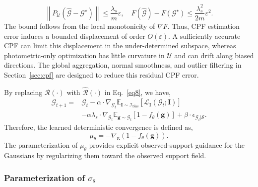 \documentclass[lettersize,journal]{IEEEtran}
\begin{document}
\begin{equation}
    \left\|P_{\mathcal{U}}(\widehat{\mathcal{G}}-\mathcal{G}^{\star})\right\|
    \le \frac{\lambda_s}{m}\varepsilon, \quad
    F(\widehat{\mathcal{G}})-F(\mathcal{G}^{\star})\le \frac{\lambda_s^2}{2m}\varepsilon^2 .
    \label{eq12_bound}
\end{equation}
The bound follows from the local monotonicity of $\nabla F$.
Thus, CPF estimation error induces a bounded displacement of order $O(\varepsilon)$. A sufficiently accurate CPF can limit this displacement in the under-determined subspace, whereas photometric-only optimization has little curvature in $\mathcal{U}$ and can drift along biased directions.
The global aggregation, normal smoothness, and outlier filtering in Section~\ref{sec:cpf} are designed to reduce this residual CPF error.

By replacing $\mathcal{R}(\cdot)$ with $\widehat{\mathcal{R}}(\cdot)$ in Eq.~\ref{eq8}, we have, 
\begin{equation}
    \begin{aligned}
    \mathcal{G}_{t+1} = &\mathcal{G}_t - \alpha \cdot \nabla_{\mathcal{G}_t} \mathbb{E}_{\mathbf{I}\sim\mathcal{I}_{\text{bias}}}\!\left[\mathcal{L}_{\mathbf{I}}(\mathcal{G}_t;\mathbf{I})\right] \\
    &- \alpha \lambda_s \cdot \nabla_{\mathcal{G}_t} \mathbb{E}_{\mathbf{g} \sim \mathcal{G}_t} \left[ 1 - f_{\theta}( \mathbf{g} ) \right] + \beta \cdot \epsilon_{\mathcal{G}_t \vert \mathcal{S}}.
    \end{aligned}
    \label{eq13}
\end{equation}
Therefore, the learned deterministic convergence is defined as, 
\begin{equation}
    \mu_{\theta} = -  \nabla_{\mathbf{g}}  (1 - f_{\theta}(\mathbf{g})).
    \label{eq13.1}
\end{equation}
The parameterization of $\mu_{\theta}$ provides explicit observed-support guidance for the Gaussians by regularizing them toward the observed support field.

\subsubsection{Parameterization of \texorpdfstring{$\sigma_{\theta}$}{sigma-theta}}
\end{document}
